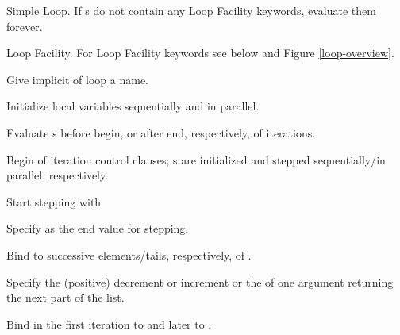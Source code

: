 \begin{LIST}{1cm}

  {
  Simple Loop. If s do not contain any Loop Facility
  keywords, evaluate them forever. 
  }

  {
  Loop Facility. For Loop Facility keywords
  see below and Figure \ref{loop-overview}.
  }

  \begin{LIST}{.5cm}
    
    {
    Give implicit  of loop a name.
    }

    {
    Initialize local variables  sequentially and  in parallel.
    }

    {
    Evaluate s before begin, or after end, respectively, of iterations.
    }

    {
    Begin of iteration control clauses; s are initialized and
    stepped sequentially/in parallel, respectively.
    }

    \begin{LIST}{.5cm}

      {
      Start stepping with 
      }

      {
      Specify  as the end value for stepping.
      }

      {
      Bind  to successive elements/tails, respectively, of .
      }

      {
      Specify the (positive) decrement or increment or the
       of one argument returning the next part of the list.
      }

      {
      Bind  in the first iteration to   and later to .
      }


\end{LIST}
\end{LIST}
\end{LIST}

